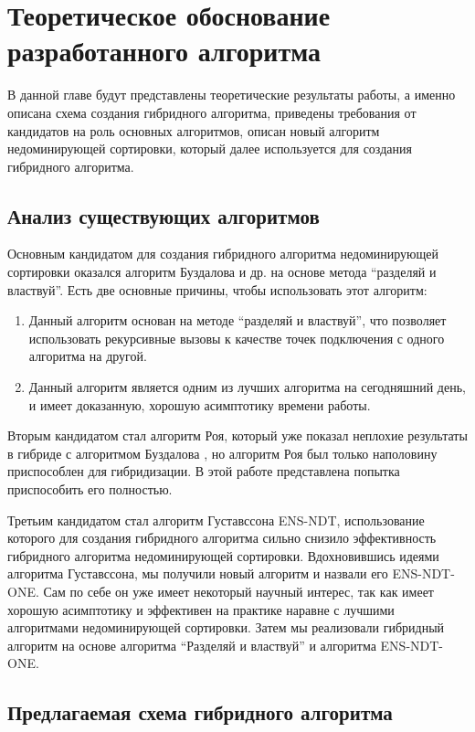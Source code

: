 \chapter{Теоретическое обоснование разработанного алгоритма}
\label{chapter2}

В данной главе будут представлены теоретические результаты работы, а именно описана схема создания гибридного алгоритма, приведены требования от кандидатов на роль основных алгоритмов, описан новый алгоритм недоминирующей сортировки, который далее используется для создания гибридного алгоритма. 

\section{Анализ существующих алгоритмов}

Основным кандидатом для создания гибридного алгоритма недоминирующей сортировки оказался алгоритм Буздалова и др. на основе метода ``разделяй и властвуй''. Есть две основные причины, чтобы использовать этот алгоритм:

\begin{enumerate}
 \item Данный алгоритм основан на методе ``разделяй и властвуй'', что позволяет использовать рекурсивные вызовы к качестве точек подключения с одного алгоритма на другой.
 \item Данный алгоритм является одним из лучших алгоритма на сегодняшний день, и имеет доказанную, хорошую асимптотику времени работы.
\end{enumerate}

Вторым кандидатом стал алгоритм Роя, который уже показал неплохие результаты в гибриде с алгоритмом Буздалова \cite{Markina}, но алгоритм Роя был только наполовину приспособлен для гибридизации. В этой работе представлена попытка приспособить его полностью. 

Третьим кандидатом стал алгоритм Густавссона ENS-NDT, использование которого для создания гибридного алгоритма сильно снизило эффективность гибридного алгоритма недоминирующей сортировки. Вдохновившись идеями алгоритма Густавссона, мы получили новый алгоритм и назвали его ENS-NDT-ONE. Сам по себе он уже имеет некоторый научный интерес, так как имеет хорошую асимптотику и эффективен на практике наравне с лучшими алгоритмами недоминирующей сортировки. Затем мы реализовали гибридный алгоритм на основе алгоритма ``Разделяй и властвуй'' и алгоритма ENS-NDT-ONE.

\section{Предлагаемая схема гибридного алгоритма}

